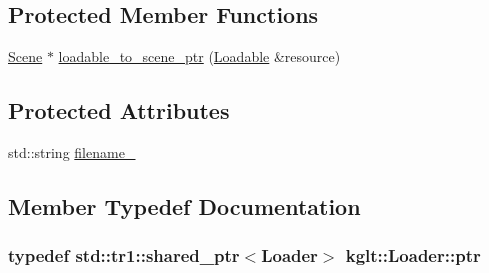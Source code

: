 \subsection*{Protected Member Functions}
\begin{DoxyCompactItemize}
\item 
\hyperlink{classkglt_1_1_scene}{Scene} $\ast$ \hyperlink{classkglt_1_1_loader_a2ea8e8d1a4f4f1443d716ae91cb0f1bf}{loadable\-\_\-to\-\_\-scene\-\_\-ptr} (\hyperlink{classkglt_1_1_loadable}{Loadable} \&resource)
\end{DoxyCompactItemize}
\subsection*{Protected Attributes}
\begin{DoxyCompactItemize}
\item 
std\-::string \hyperlink{classkglt_1_1_loader_ac6d7cf644388ad9ba8c63941274eee26}{filename\-\_\-}
\end{DoxyCompactItemize}


\subsection{Member Typedef Documentation}
\hypertarget{classkglt_1_1_loader_a8755ac58226017c031594bfd682a08f8}{
\subsubsection[{ptr}]{\setlength{\rightskip}{0pt plus 5cm}typedef std\-::tr1\-::shared\-\_\-ptr$<${\bf Loader}$>$ {\bf kglt\-::\-Loader\-::ptr}}}\label{classkglt_1_1_loader_a8755ac58226017c031594bfd682a08f8}


